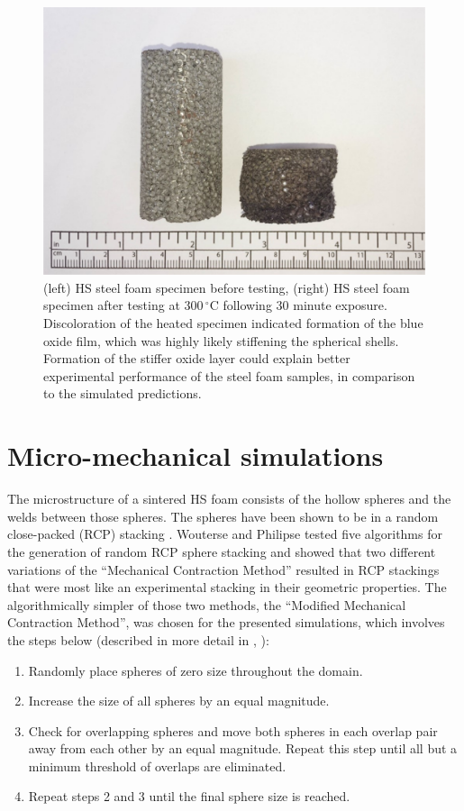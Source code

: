 \documentclass[review]{elsarticle}
\begin{document}
{\begin{figure}[htbp]
	\begin{center}
		\includegraphics[width=0.75\linewidth]
		{Tex-Figures/Fig09-Blue_brittleness.pdf}
		\caption{(left) HS steel foam specimen before testing, (right) HS steel foam specimen after testing at $300\,^{\circ}\mathrm{C}$ following 30 minute exposure. Discoloration of the heated specimen indicated formation of the blue oxide film, which was highly likely stiffening the spherical shells. Formation of the stiffer oxide layer could explain better experimental performance of the steel foam samples, in comparison to the simulated predictions.}
		\label{fig:BlueOxide}
	\end{center}
\end{figure}

\FloatBarrier

\section{Micro-mechanical simulations}

The microstructure of a sintered HS foam consists of the hollow spheres and the welds between those spheres. The spheres have been shown to be in a random close-packed (RCP) stacking \cite{Gaoetal2008}. Wouterse and Philipse \cite{WouPhi2006} tested five algorithms for the generation of random RCP sphere stacking and showed that two different variations of the “Mechanical Contraction Method” resulted in RCP stackings that were most like an experimental stacking in their geometric properties. The algorithmically simpler of those two methods, the “Modified Mechanical Contraction Method”, was chosen for the presented simulations, which involves the steps below (described in more detail in \cite{Kansaletal2002}, \cite{WilliamsandPhilipse2003}):

\begin{enumerate}
	\item Randomly place spheres of zero size throughout the domain.
	\item Increase the size of all spheres by an equal magnitude.
	\item Check for overlapping spheres and move both spheres in each overlap pair away from each other by an equal magnitude. Repeat this step until all but a minimum threshold of overlaps are eliminated.
	\item Repeat steps 2 and 3 until the final sphere size is reached.
\end{enumerate}

}
\end{document}

